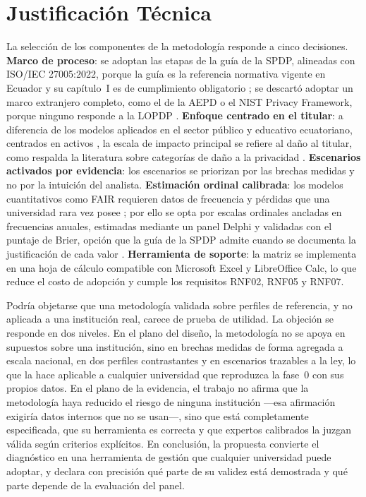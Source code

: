 \section{Justificación Técnica}

La selección de los componentes de la metodología responde a cinco decisiones. \textbf{Marco de proceso}: se adoptan las etapas de la guía de la SPDP, alineadas con ISO/IEC 27005:2022, porque la guía es la referencia normativa vigente en Ecuador y su capítulo~I es de cumplimiento obligatorio \cite{spdp2025guia,spdp2026guiav2}; se descartó adoptar un marco extranjero completo, como el de la AEPD o el NIST Privacy Framework, porque ninguno responde a la LOPDP \cite{aepd2021riesgo,nist2020privacy}. \textbf{Enfoque centrado en el titular}: a diferencia de los modelos aplicados en el sector público y educativo ecuatoriano, centrados en activos \cite{patino2018ict,lopezvasco2025iso}, la escala de impacto principal se refiere al daño al titular, como respalda la literatura sobre categorías de daño a la privacidad \cite{wairimu2025harm}. \textbf{Escenarios activados por evidencia}: los escenarios se priorizan por las brechas medidas y no por la intuición del analista. \textbf{Estimación ordinal calibrada}: los modelos cuantitativos como FAIR requieren datos de frecuencia y pérdidas que una universidad rara vez posee \cite{wang2020fair}; por ello se opta por escalas ordinales ancladas en frecuencias anuales, estimadas mediante un panel Delphi y validadas con el puntaje de Brier, opción que la guía de la SPDP admite cuando se documenta la justificación de cada valor \cite{spdp2026guiav2}. \textbf{Herramienta de soporte}: la matriz se implementa en una hoja de cálculo compatible con Microsoft Excel y LibreOffice Calc, lo que reduce el costo de adopción y cumple los requisitos RNF02, RNF05 y RNF07.

Podría objetarse que una metodología validada sobre perfiles de referencia, y no aplicada a una institución real, carece de prueba de utilidad. La objeción se responde en dos niveles. En el plano del diseño, la metodología no se apoya en supuestos sobre una institución, sino en brechas medidas de forma agregada a escala nacional, en dos perfiles contrastantes y en escenarios trazables a la ley, lo que la hace aplicable a cualquier universidad que reproduzca la fase~0 con sus propios datos. En el plano de la evidencia, el trabajo no afirma que la metodología haya reducido el riesgo de ninguna institución ---esa afirmación exigiría datos internos que no se usan---, sino que está completamente especificada, que su herramienta es correcta y que expertos calibrados la juzgan válida según criterios explícitos. En conclusión, la propuesta convierte el diagnóstico en una herramienta de gestión que cualquier universidad puede adoptar, y declara con precisión qué parte de su validez está demostrada y qué parte depende de la evaluación del panel.
